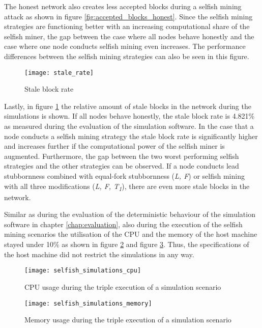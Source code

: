 The honest network also creates less accepted blocks during a selfish mining attack as shown in figure \ref{fig:accepted_blocks_honest}.
Since the selfish mining strategies are functioning better with an increasing computational share of the selfish miner, the gap between the case where all nodes behave honestly and the case where one node conducts selfish mining even increases.
The performance differences between the selfish mining strategies can also be seen in this figure.

\begin{figure}[t]
\texttt{[image: stale\_rate]}
\centering
\caption{Stale block rate}
\label{fig:stale_rate}
\end{figure}

Lastly, in figure \ref{fig:stale_rate} the relative amount of stale blocks in the network during the simulations is shown.
If all nodes behave honestly, the stale block rate is 4.821\% as measured during the evaluation of the simulation software.
In the case that a node conducts a selfish mining strategy the stale block rate is significantly higher and increases further if the computational power of the selfish miner is augmented.
Furthermore, the gap between the two worst performing selfish strategies and the other strategies can be observed.
If a node conducts lead stubbornness combined with equal-fork stubbornness (\textit{L, F}) or selfish mining with all three modifications (\textit{L, F, T\textsubscript{1}}), there are even more stale blocks in the network.

Similar as during the evaluation of the deterministic behaviour of the simulation software in chapter \ref{chap:evaluation}, also during the execution of the selfish mining scenarios the utilisation of the CPU and the memory of the host machine stayed under 10\% as shown in figure \ref{fig:selfish_simulations_cpu} and figure \ref{fig:selfish_simulations_memory}.
Thus, the specifications of the host machine did not restrict the simulations in any way.

\begin{figure}[t]
\texttt{[image: selfish\_simulations\_cpu]}
\centering
\caption{CPU usage during the triple execution of a simulation scenario}
\label{fig:selfish_simulations_cpu}
\end{figure}

\begin{figure}[t]
\texttt{[image: selfish\_simulations\_memory]}
\centering
\caption{Memory usage during the triple execution of a simulation scenario}
\label{fig:selfish_simulations_memory}
\end{figure}


